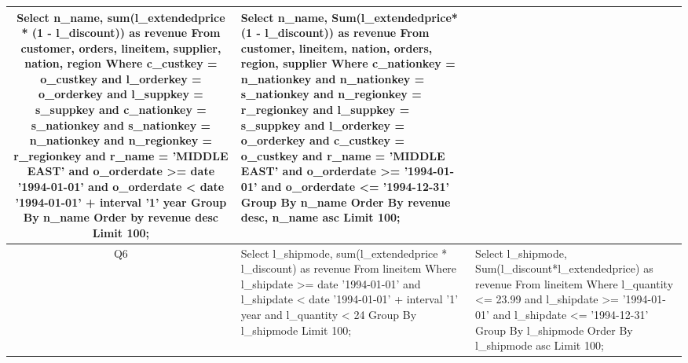 \begin{center}
\begin{supertabular}{|c|p{7cm}|p{7cm}|}
\footnotesize{Select n\_name, sum(l\_extendedprice * (1 - l\_discount)) as revenue        From customer, orders, lineitem, supplier, nation, region        Where c\_custkey = o\_custkey and l\_orderkey = o\_orderkey and l\_suppkey = s\_suppkey and        c\_nationkey = s\_nationkey and s\_nationkey = n\_nationkey and n\_regionkey = r\_regionkey and        r\_name = 'MIDDLE EAST' and o\_orderdate >= date '1994-01-01' and o\_orderdate < date        '1994-01-01' + interval '1' year        Group By n\_name        Order by revenue desc Limit 100;} &
\footnotesize{Select n\_name, Sum(l\_extendedprice*(1 - l\_discount)) as revenue  From customer, lineitem, nation, orders, region, supplier   Where c\_nationkey = n\_nationkey  and n\_nationkey = s\_nationkey  and n\_regionkey = r\_regionkey  and l\_suppkey = s\_suppkey  and l\_orderkey = o\_orderkey  and c\_custkey = o\_custkey  and r\_name = 'MIDDLE EAST'  and o\_orderdate  >= '1994-01-01' and o\_orderdate <= '1994-12-31'   Group By n\_name   Order By revenue desc, n\_name asc   Limit 100;} \\\hline\footnotesize{Q6} &
\footnotesize{Select l\_shipmode, sum(l\_extendedprice * l\_discount) as revenue From lineitem        Where l\_shipdate >= date '1994-01-01' and l\_shipdate < date '1994-01-01' + interval '1' year and        l\_quantity < 24 Group By l\_shipmode Limit 100;} &
\footnotesize{Select l\_shipmode, Sum(l\_discount*l\_extendedprice) as revenue  From lineitem   Where l\_quantity  <= 23.99  and l\_shipdate  >= '1994-01-01' and l\_shipdate <= '1994-12-31'   Group By l\_shipmode   Order By l\_shipmode asc   Limit 100;} \\\hline\end{supertabular}
\label{result:basic}\end{center}
\twocolumn